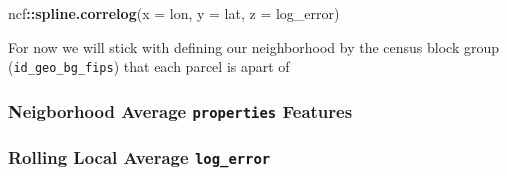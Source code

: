 \documentclass[]{book}
\newenvironment{Shaded}{\begin{snugshade}}{\end{snugshade}}
\newcommand{\KeywordTok}[1]{\textcolor[rgb]{0.13,0.29,0.53}{\textbf{#1}}}
\newcommand{\DataTypeTok}[1]{\textcolor[rgb]{0.13,0.29,0.53}{#1}}
\newcommand{\DecValTok}[1]{\textcolor[rgb]{0.00,0.00,0.81}{#1}}
\newcommand{\StringTok}[1]{\textcolor[rgb]{0.31,0.60,0.02}{#1}}
\newcommand{\CommentTok}[1]{\textcolor[rgb]{0.56,0.35,0.01}{\textit{#1}}}
\newcommand{\OtherTok}[1]{\textcolor[rgb]{0.56,0.35,0.01}{#1}}
\newcommand{\OperatorTok}[1]{\textcolor[rgb]{0.81,0.36,0.00}{\textbf{#1}}}
\newcommand{\NormalTok}[1]{#1}
\theoremstyle{definition}
\theoremstyle{definition}
\theoremstyle{definition}
\theoremstyle{remark}
\begin{document}
\begin{Shaded}
\begin{Highlighting}[]
\NormalTok{ncf}\OperatorTok{::}\KeywordTok{spline.correlog}\NormalTok{(}\DataTypeTok{x =}\NormalTok{ lon, }\DataTypeTok{y =}\NormalTok{ lat, }\DataTypeTok{z =}\NormalTok{ log_error)}
\end{Highlighting}
\end{Shaded}

For now we will stick with defining our neighborhood by the census block
group (\texttt{id\_geo\_bg\_fips}) that each parcel is apart of

\subsubsection{\texorpdfstring{Neigborhood Average \texttt{properties}
Features}{Neigborhood Average properties Features}}\label{neigborhood-average-properties-features}

\begin{Shaded}
\end{Shaded}

\subsubsection{\texorpdfstring{Rolling Local Average
\texttt{log\_error}}{Rolling Local Average log\_error}}\label{rolling-local-average-log_error}
\end{document}
